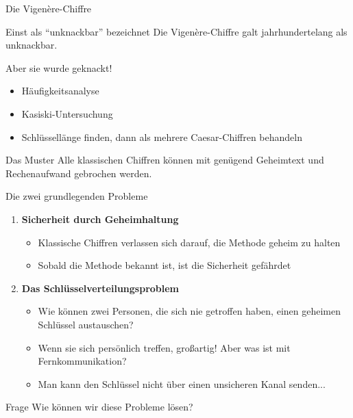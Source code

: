 \documentclass[handout]{beamer}
\begin{document}
\begin{frame}{Die Vigenère-Chiffre}
\begin{block}{Einst als ``unknackbar'' bezeichnet}
Die Vigenère-Chiffre galt jahrhundertelang als unknackbar.
\end{block}

\pause

\begin{alertblock}{Aber sie wurde geknackt!}
\begin{itemize}
    \item Häufigkeitsanalyse
    \item Kasiski-Untersuchung
    \item Schlüssellänge finden, dann als mehrere Caesar-Chiffren behandeln
\end{itemize}
\end{alertblock}

\pause

\begin{block}{Das Muster}
Alle klassischen Chiffren können mit genügend Geheimtext und Rechenaufwand gebrochen werden.
\end{block}
\end{frame}

\begin{frame}{Die zwei grundlegenden Probleme}
\begin{enumerate}
    \item \textbf{Sicherheit durch Geheimhaltung}
    \begin{itemize}
        \item Klassische Chiffren verlassen sich darauf, die Methode geheim zu halten
        \item Sobald die Methode bekannt ist, ist die Sicherheit gefährdet
    \end{itemize}

    \pause

    \item \textbf{Das Schlüsselverteilungsproblem}
    \begin{itemize}
        \item Wie können zwei Personen, die sich nie getroffen haben, einen geheimen Schlüssel austauschen?
        \item Wenn sie sich persönlich treffen, großartig! Aber was ist mit Fernkommunikation?
        \item Man kann den Schlüssel nicht über einen unsicheren Kanal senden...
    \end{itemize}
\end{enumerate}

\pause

\begin{alertblock}{Frage}
Wie können wir diese Probleme lösen?
\end{alertblock}
\end{frame}
\end{document}
